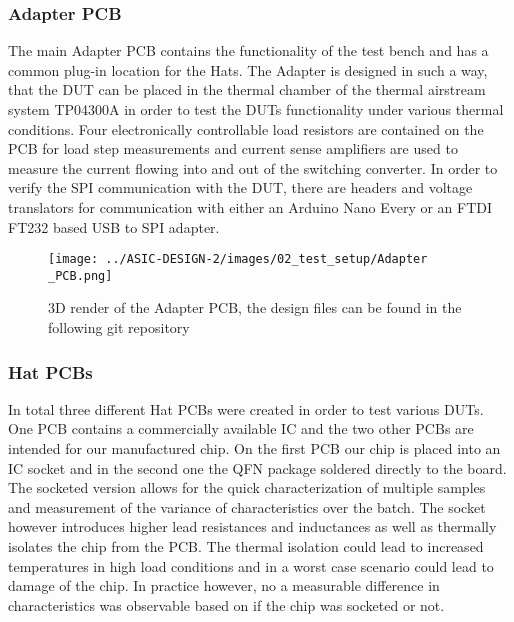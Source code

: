 \clearpage

\subsubsection{Adapter PCB}
The main Adapter \ac{PCB} contains the functionality of the test bench and has a common plug-in location for the Hats. The Adapter is designed in such a way, that the \ac{DUT} can be placed in the thermal chamber of the thermal airstream system TP04300A in order to test the \ac{DUT}s functionality under various thermal conditions. Four electronically controllable load resistors are contained on the \ac{PCB} for load step measurements and current sense amplifiers are used to measure the current flowing into and out of the switching converter. In order to verify the SPI communication with the \ac{DUT}, there are headers and voltage translators for communication with either an Arduino Nano Every or an FTDI FT232 based USB to SPI adapter.

\begin{figure}[h]
    \centering
    \texttt{[image: ../ASIC-DESIGN-2/images/02\_test\_setup/Adapter \_PCB.png]}
    \caption{3D render of the Adapter PCB, the design files can be found in the following git repository \cite{PCB_schematic}}
    \label{fig:Adapter_PCB}
\end{figure}

\clearpage

\subsubsection{Hat PCBs}
In total three different Hat \ac{PCB}s were created in order to test various \ac{DUT}s. One \ac{PCB} contains a commercially available \ac{IC} and the two other \ac{PCB}s are intended for our manufactured chip. On the first \ac{PCB} our chip is placed into an \ac{IC} socket and in the second one the QFN package soldered directly to the board. The socketed version allows for the quick characterization of multiple samples and measurement of the variance of characteristics over the batch. The socket however introduces higher lead resistances and inductances as well as thermally isolates the chip from the \ac{PCB}. The thermal isolation could lead to increased temperatures in high load conditions and in a worst case scenario could lead to damage of the chip. In practice however, no a measurable difference in characteristics was observable based on if the chip was socketed or not.\\


